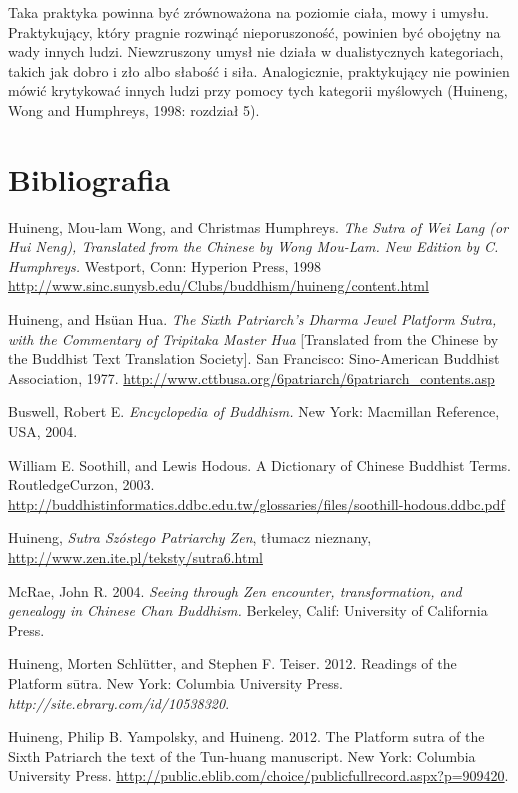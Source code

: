 Taka praktyka powinna być zrównoważona na poziomie ciała, mowy i umysłu. Praktykujący, który pragnie rozwinąć nieporuszoność, powinien być obojętny na wady innych ludzi. Niewzruszony umysł nie działa w dualistycznych kategoriach, takich jak dobro i zło albo słabość i siła. Analogicznie, praktykujący nie powinien mówić krytykować innych ludzi przy pomocy tych kategorii myślowych (Huineng, Wong and Humphreys, 1998: rozdział 5).

\section*{Bibliografia}

Huineng, Mou-lam Wong, and Christmas Humphreys. \emph{The Sutra of Wei Lang (or Hui Neng), Translated from the Chinese by Wong Mou-Lam. New Edition by C. Humphreys.} Westport, Conn: Hyperion Press, 1998 
\url{http://www.sinc.sunysb.edu/Clubs/buddhism/huineng/content.html}

Huineng, and Hsüan Hua. \emph{The Sixth Patriarch's Dharma Jewel Platform Sutra, with the Commentary of Tripitaka Master Hua} [Translated from the Chinese by the Buddhist Text Translation Society]. San Francisco: Sino-American Buddhist Association, 1977.
\url{http://www.cttbusa.org/6patriarch/6patriarch_contents.asp}

Buswell, Robert E. \emph{Encyclopedia of Buddhism.} New York: Macmillan Reference, USA, 2004. 

William E. Soothill, and Lewis Hodous. A Dictionary of Chinese Buddhist Terms. RoutledgeCurzon, 2003. \url{http://buddhistinformatics.ddbc.edu.tw/glossaries/files/soothill-hodous.ddbc.pdf}


Huineng, \emph{Sutra Szóstego Patriarchy Zen}, tłumacz nieznany, \url{http://www.zen.ite.pl/teksty/sutra6.html}


McRae, John R. 2004. \emph{Seeing through Zen encounter, transformation, and genealogy in Chinese Chan Buddhism.} Berkeley, Calif: University of California Press.

Huineng, Morten Schlütter, and Stephen F. Teiser. 2012. Readings of the Platform sūtra. New York: Columbia University Press. \emph{http://site.ebrary.com/id/10538320}.

Huineng, Philip B. Yampolsky, and Huineng. 2012. The Platform sutra of the Sixth Patriarch the text of the Tun-huang manuscript. New York: Columbia University Press. \url{http://public.eblib.com/choice/publicfullrecord.aspx?p=909420}.
